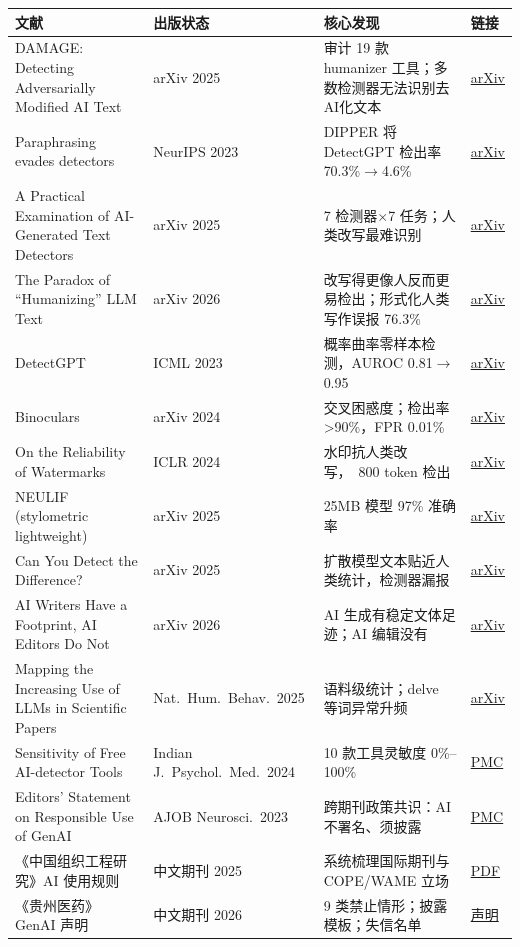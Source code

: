 \documentclass[10pt,a4paper]{ctexart}
\begin{document}
\begin{longtable}{L{3.4cm} L{2.2cm} L{5.6cm} L{2.8cm}}
\toprule
文献 & 出版状态 & 核心发现 & 链接 \\
\midrule
\endhead
DAMAGE: Detecting Adversarially Modified AI Text & arXiv 2025 & 审计 19 款 humanizer 工具；多数检测器无法识别去AI化文本 & \href{https://arxiv.org/abs/2501.03437}{arXiv} \\
Paraphrasing evades detectors & NeurIPS 2023 & DIPPER 将 DetectGPT 检出率 70.3\%$\to$4.6\% & \href{https://arxiv.org/abs/2303.13408}{arXiv} \\
A Practical Examination of AI-Generated Text Detectors & arXiv 2025 & 7 检测器×7 任务；人类改写最难识别 & \href{https://arxiv.org/abs/2412.05139}{arXiv} \\
The Paradox of “Humanizing” LLM Text & arXiv 2026 & 改写得更像人反而更易检出；形式化人类写作误报 76.3\% & \href{https://arxiv.org/abs/2610.03110}{arXiv} \\
DetectGPT & ICML 2023 & 概率曲率零样本检测，AUROC 0.81$\to$0.95 & \href{https://arxiv.org/abs/2301.11305}{arXiv} \\
Binoculars & arXiv 2024 & 交叉困惑度；检出率 >90\%，FPR 0.01\% & \href{https://arxiv.org/abs/2401.12070}{arXiv} \\
On the Reliability of Watermarks & ICLR 2024 & 水印抗人类改写，~800 token 检出 & \href{https://arxiv.org/abs/2306.04634}{arXiv} \\
NEULIF (stylometric lightweight) & arXiv 2025 & 25MB 模型 97\% 准确率 & \href{https://arxiv.org/abs/2511.21744}{arXiv} \\
Can You Detect the Difference? & arXiv 2025 & 扩散模型文本贴近人类统计，检测器漏报 & \href{https://arxiv.org/abs/2507.10475}{arXiv} \\
AI Writers Have a Footprint, AI Editors Do Not & arXiv 2026 & AI 生成有稳定文体足迹；AI 编辑没有 & \href{https://arxiv.org/abs/2608.27855}{arXiv} \\
Mapping the Increasing Use of LLMs in Scientific Papers & Nat.\ Hum.\ Behav.\ 2025 & 语料级统计；delve 等词异常升频 & \href{https://arxiv.org/abs/2404.01268}{arXiv} \\
Sensitivity of Free AI-detector Tools & Indian J.\ Psychol.\ Med.\ 2024 & 10 款工具灵敏度 0\%–100\% & \href{https://pmc.ncbi.nlm.nih.gov/articles/PMC11572508/}{PMC} \\
Editors’ Statement on Responsible Use of GenAI & AJOB Neurosci.\ 2023 & 跨期刊政策共识：AI 不署名、须披露 & \href{https://pmc.ncbi.nlm.nih.gov/articles/PMC11027931/}{PMC} \\
《中国组织工程研究》AI 使用规则 & 中文期刊 2025 & 系统梳理国际期刊与 COPE/WAME 立场 & \href{https://www.cjter.com/attached/file/20240420/20240420151441_458.pdf}{PDF} \\
《贵州医药》GenAI 声明 & 中文期刊 2026 & 9 类禁止情形；披露模板；失信名单 & \href{http://gzyi.cbpt.cnki.net/portal/journal/portal/client/news/f5b426920bb15af72f52d1d7c62bf3a0}{声明} \\
\bottomrule
\end{longtable}
\end{document}
